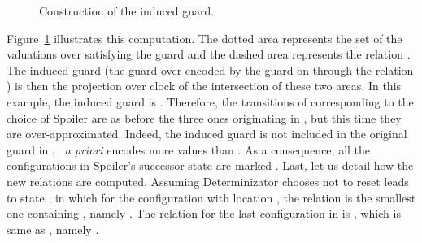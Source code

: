 \documentclass{LMCS}
\theoremstyle{plain}\newtheorem{proposition}[thm]{Proposition}
\begin{document}
\begin{exa}
\begin{figure}[htbp]
\begin{center}
{}\caption{Construction of the induced guard.
}\label{fig:ind-guard}
\end{center}
\end{figure}
Figure~\ref{fig:ind-guard} illustrates this computation.  The dotted
area represents the set of the valuations over  satisfying
the guard  and the dashed area represents the relation
. The induced guard  (\ie the guard
over  encoded by the guard  on  through the relation ) is
then the projection over clock  of the intersection of these two
areas. In this example, the induced guard is . Therefore, the
transitions of  corresponding to the choice of Spoiler 
are as before the three ones originating in , but this time they
are over-approximated. Indeed, the induced guard 
is not included in the original guard  in , \ie~{\em a priori}
 encodes more values than .  As a consequence, all the
configurations in Spoiler's successor state are marked .
Last, let us detail how the new relations are computed.
Assuming Determinizator chooses not to reset  leads to state ,
in which for the configuration with location , the relation is
the smallest one containing , namely
. The relation for the last configuration in  is
, which is same as
, namely .

\end{exa}
\end{document}
